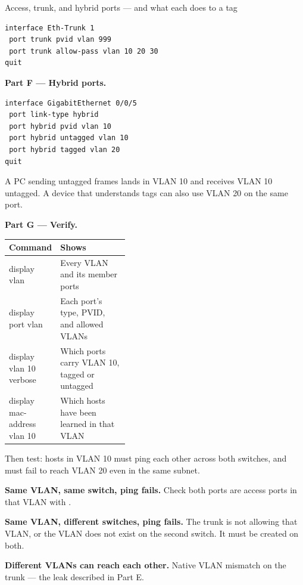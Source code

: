 \begin{labproject}{Access, trunk, and hybrid ports --- and what each does to a tag}
\begin{lstlisting}[style=dcnterminal]
interface Eth-Trunk 1
 port trunk pvid vlan 999
 port trunk allow-pass vlan 10 20 30
quit
\end{lstlisting}

\medskip\noindent\textbf{Part F --- Hybrid ports.}\par

\begin{lstlisting}[style=dcnterminal]
interface GigabitEthernet 0/0/5
 port link-type hybrid
 port hybrid pvid vlan 10
 port hybrid untagged vlan 10
 port hybrid tagged vlan 20
quit
\end{lstlisting}

A PC sending untagged frames lands in VLAN 10 and receives VLAN 10 untagged. A device that understands tags can also use VLAN 20 on the same port.

\medskip\noindent\textbf{Part G --- Verify.}\par

\begin{commandmap}
\begin{tabularx}{\linewidth}{@{}>{\ttfamily}p{0.40\linewidth}X@{}}
\toprule
\rowcolor{MLPaleBlue!92}
\textrm{\bfseries Command} & \bfseries Shows \\
\midrule
display vlan & Every VLAN and its member ports \\
display port vlan & Each port's type, PVID, and allowed VLANs \\
display vlan 10 verbose & Which ports carry VLAN 10, tagged or untagged \\
display mac-address vlan 10 & Which hosts have been learned in that VLAN \\
\bottomrule
\end{tabularx}
\end{commandmap}

Then test: hosts in VLAN 10 must ping each other across both switches, and must fail to reach VLAN 20 even in the same subnet.

\begin{troubleshoot}
\textbf{Same VLAN, same switch, ping fails.} Check both ports are access ports in that VLAN with .

\textbf{Same VLAN, different switches, ping fails.} The trunk is not allowing that VLAN, or the VLAN does not exist on the second switch. It must be created on both.

\textbf{Different VLANs can reach each other.} Native VLAN mismatch on the trunk --- the leak described in Part E.


\end{troubleshoot}
\end{labproject}
